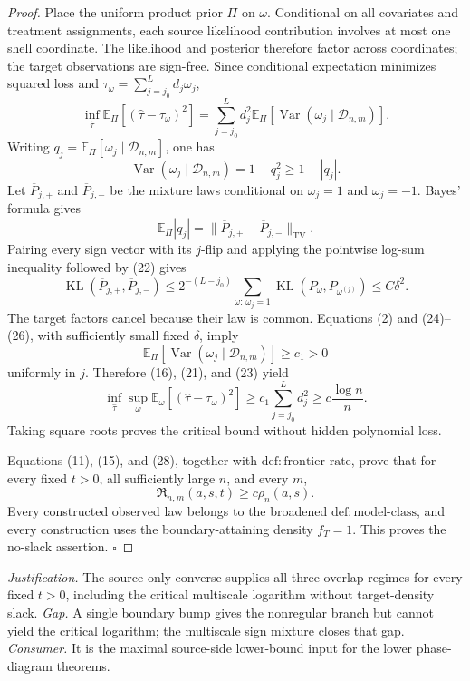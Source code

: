 \documentclass{article}
\begin{document}
\begin{proof}
Place the uniform product prior \(\Pi\) on \(\omega\). Conditional on all covariates and treatment assignments, each source likelihood contribution involves at most one shell coordinate. The likelihood and posterior therefore factor across coordinates; the target observations are sign-free. Since conditional expectation minimizes squared loss and \(\tau_\omega=\sum_{j=j_0}^Ld_j\omega_j\),
\[
 \inf_{\widehat\tau}
 \mathbb E_\Pi[(\widehat\tau-\tau_\omega)^2]
 =\sum_{j=j_0}^Ld_j^2
   \mathbb E_\Pi[\operatorname{Var}(\omega_j\mid\mathcal D_{n,m})].
\tag{23}
\]
Writing \(q_j=\mathbb E_\Pi[\omega_j\mid\mathcal D_{n,m}]\), one has
\[
 \operatorname{Var}(\omega_j\mid\mathcal D_{n,m})
 =1-q_j^2\ge1-|q_j|.
\tag{24}
\]
Let \(\overline P_{j,+}\) and \(\overline P_{j,-}\) be the mixture laws conditional on \(\omega_j=1\) and \(\omega_j=-1\). Bayes' formula gives
\[
 \mathbb E_\Pi|q_j|
 =\lVert\overline P_{j,+}-\overline P_{j,-}\rVert_{\mathrm{TV}}.
\tag{25}
\]
Pairing every sign vector with its \(j\)-flip and applying the pointwise log-sum inequality followed by (22) gives
\[
 \operatorname{KL}(\overline P_{j,+},\overline P_{j,-})
 \le 2^{-(L-j_0)}
 \sum_{\omega:\,\omega_j=1}
 \operatorname{KL}(P_\omega,P_{\omega^{(j)}})
 \le C\delta^2.
\tag{26}
\]
The target factors cancel because their law is common. Equations (2) and (24)--(26), with sufficiently small fixed \(\delta\), imply
\[
 \mathbb E_\Pi[\operatorname{Var}
   (\omega_j\mid\mathcal D_{n,m})]
 \ge c_1>0
\tag{27}
\]
uniformly in \(j\). Therefore (16), (21), and (23) yield
\[
 \inf_{\widehat\tau}\sup_\omega
 \mathbb E_\omega[(\widehat\tau-\tau_\omega)^2]
 \ge c_1\sum_{j=j_0}^Ld_j^2
 \ge c\frac{\log n}{n}.
\tag{28}
\]
Taking square roots proves the critical bound without hidden polynomial loss.

Equations (11), (15), and (28), together with \(\mathrm{def:frontier\text{-}rate}\), prove that for every fixed \(t>0\), all sufficiently large \(n\), and every \(m\),
\[
 \mathfrak R_{n,m}(a,s,t)\ge c\rho_n(a,s).
\]
Every constructed observed law belongs to the broadened \(\mathrm{def:model\text{-}class}\), and every construction uses the boundary-attaining density \(f_T=1\). This proves the no-slack assertion. \(\square\)
\end{proof}
\par\smallskip\noindent \textit{Justification.} The source-only converse supplies all three overlap regimes for every fixed \(t>0\), including the critical multiscale logarithm without target-density slack. \textit{Gap.} A single boundary bump gives the nonregular branch but cannot yield the critical logarithm; the multiscale sign mixture closes that gap. \textit{Consumer.} It is the maximal source-side lower-bound input for the lower phase-diagram theorems.
\end{document}
